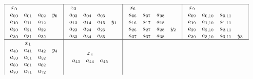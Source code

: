 \begin{figure}[ht]
{\footnotesize
\[
\begin{array}{| c | c | c | c |} \hline
\begin{array}{c c c c}
x_0\\
a_{00} & a_{01} &a_{02} & y_0\\
a_{10} & a_{11} &a_{12} & \\
a_{20} & a_{21} &a_{22} & \\
a_{30} & a_{31} &a_{32} & \\
\end{array}
&
\begin{array}{c c c c}
x_3\\
a_{03} & a_{04} &a_{05} & \\
a_{13} & a_{14} &a_{15} & y_1\\
a_{23} & a_{24} &a_{25} & \\
a_{33} & a_{34} &a_{35} & \\
\end{array}
&
\begin{array}{c c c c}
x_6\\
a_{06} & a_{07} &a_{08} & \\
a_{16} & a_{17} &a_{18} & \\
a_{26} & a_{27} &a_{28} & y_2 \\
a_{37} & a_{37} &a_{38} & \\
\end{array}
&
\begin{array}{c c c c}
x_9\\
a_{09} & a_{0,10} & a_{0,11} & \\
a_{19} & a_{1,10} & a_{1,11} & \\
a_{29} & a_{2,10} & a_{2,11} & \\
a_{39} & a_{3,10} & a_{3,11} & y_3 \\
\end{array}
\\ \hline
\begin{array}{c c c c}
& x_1\\
a_{40} & a_{41} &a_{42} & y_4\\
a_{50} & a_{51} &a_{52} & \\
a_{60} & a_{61} &a_{62} & \\
a_{70} & a_{71} &a_{72} & \\
\end{array}
&
\begin{array}{c c c c}
& x_4\\
a_{43} & a_{44} &a_{45} & \\

\end{array}
\end{array}\]}
\end{figure}
